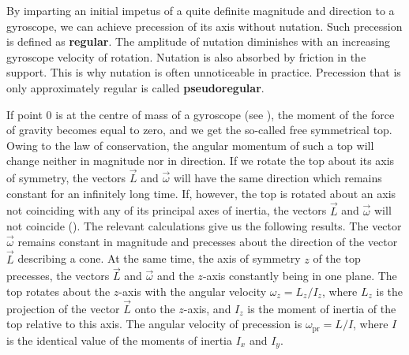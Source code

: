 By imparting an initial impetus of a quite definite magnitude and direction to a gyroscope, we can achieve precession of its axis without nutation. Such precession is defined as \textbf{regular}. The amplitude of nutation diminishes with an increasing gyroscope velocity of rotation. Nutation is also absorbed by friction in the support. This is why nutation is often unnoticeable in practice. Precession that is only approximately regular is called \textbf{pseudoregular}.

If point $0$ is at the centre of mass of a gyroscope (see ), the moment of the force of gravity becomes equal to zero, and we get the so-called free symmetrical top. Owing to the law of conservation, the angular momentum of such a top will change neither in magnitude nor in direction. If we rotate the top about its axis of symmetry, the vectors $\vec{L}$ and $\vec{\omega}$ will have the same direction which remains constant for an infinitely long time. If, however, the top is rotated about an axis not coinciding with any of its principal axes of inertia, the vectors $\vec{L}$ and $\vec{\omega}$ will not coincide (). The relevant calculations give us the following results. The vector $\vec{\omega}$ remains constant in magnitude and precesses about the direction of the vector $\vec{L}$ describing a cone. At the same time, the axis of symmetry $z$ of the top precesses, the vectors $\vec{L}$ and $\vec{\omega}$ and the $z$-axis constantly being in one plane. The top rotates about the $z$-axis with the angular velocity $\omega_z=L_z/I_z$, where $L_z$ is the projection of the vector $\vec{L}$ onto the $z$-axis, and $I_z$ is the moment of inertia of the top relative to this axis. The angular velocity of precession is $\omega_{\text{pr}}=L/I$, where $I$ is the identical value of the moments of inertia $I_x$ and $I_y$.

